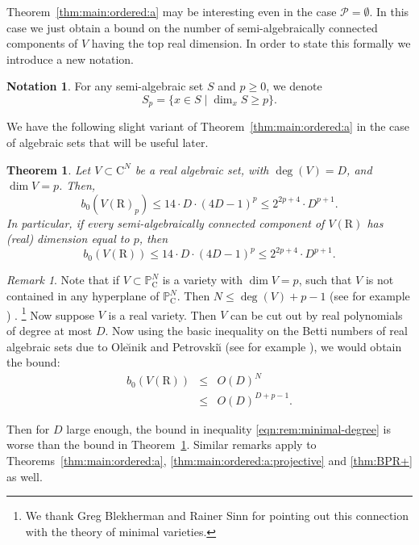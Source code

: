 \documentclass[10pt]{amsart}
\newtheorem{theorem}{Theorem}
\theoremstyle{definition}
\newtheorem{notation}{Notation}[section]
\theoremstyle{remark}
\newtheorem{remark}{Remark}
\numberwithin{equation}{section}
\newcommand {\R} {\mathrm{R}}
\newcommand {\C}     {\mathrm{C}}
\newcommand {\PP}     {\mathbb{P}} %
\begin{document}
Theorem~\ref{thm:main:ordered:a} may be interesting even in the case
$\mathcal{P} = \emptyset$. In this case we just obtain a bound on the number of semi-algebraically connected components of $V$ having the top real dimension.
In order to state this formally we introduce a new notation.
\begin{notation}
\label{not:S_p}
For any semi-algebraic set $S$ and $p \geq 0$, we denote 
\[
    S_p =  \{x \in S \mid \dim_x S \geq p\}.
\]
\end{notation}

We have the following slight variant of Theorem~\ref{thm:main:ordered:a}
in the case of algebraic sets that will be useful later.

\begin{theorem}
\label{thm:main:ordered:a'}
    Let $V \subset \C^N$ be a real algebraic set, with $\deg(V) =D$, and
    $\dim V = p$.
    Then,
    \begin{equation}
    \label{eqn:thm:main:ordered:a'}   
     b_0(V(\R)_p) \leq  14 \cdot D \cdot (4D-1)^{p} \leq 2^{2p+4} \cdot D^{p+1}.
    \end{equation}
    In particular,
    if every semi-algebraically connected component of $V(\R)$ has (real) dimension equal to $p$, 
    then
    \[
    b_0(V(\R)) \leq
    14 \cdot D \cdot (4D-1)^{p} \leq 2^{2p+4} \cdot D^{p+1}.
    \]
\end{theorem}

\begin{remark}
\label{rem:minimal-degree}
Note that if $V \subset \PP_\C^N$ is a variety with $\dim V = p$, such that 
$V$ is not contained in any hyperplane of $\PP_\C^N$. Then
$N \leq \deg(V) + p - 1$ (see for example \cite[Proposition 4.5.6]{Beltrametti-et-al}) 
. 
\footnote{We thank Greg Blekherman and Rainer Sinn for pointing out this connection with the theory of minimal varieties.} 
Now suppose $V$ is a real variety. Then $V$ can be cut out by real  polynomials
of degree at most $D$. 
Now 
using the basic inequality on the Betti numbers of real algebraic sets due to Ole{\u\i}nik and Petrovski{\u\i} \cite{OP}
    (see for example \cite[Proposition 7.28]{BPRbook2}),
we would obtain  the bound:
\begin{eqnarray}
\nonumber
b_0(V(\R))
&\leq&
O(D)^N\\
\label{eqn:rem:minimal-degree}
&\leq&
O(D)^{D+p-1}.
\end{eqnarray}

Then for $D$ large enough,
the bound in inequality \eqref{eqn:rem:minimal-degree} is worse than the bound in Theorem~\ref{thm:main:ordered:a'}.
Similar remarks apply to Theorems~\ref{thm:main:ordered:a}, \ref{thm:main:ordered:a:projective} and \ref{thm:BPR+} as well.  
\end{remark}
\end{document}
